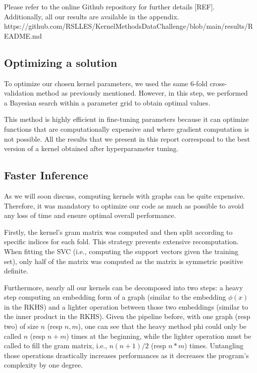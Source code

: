 \documentclass{IEEEtran}
\begin{document}
Please refer to the online Github repository for further details [REF]. Additionally, all our results are available in the appendix.
https://github.com/RSLLES/KernelMethodsDataChallenge/blob/main/results/README.md

\subsection{Optimizing a solution}
To optimize our chosen kernel parameters, we used the same 6-fold cross-validation method as previously mentioned. However, in this step, we performed a Bayesian search within a parameter grid to obtain optimal values.

This method is highly efficient in fine-tuning parameters because it can optimize functions that are computationally expensive and where gradient computation is not possible. All the results that we present in this report correspond to the best version of a kernel obtained after hyperparameter tuning.



\subsection{Faster Inference}
As we will soon discuss, computing kernels with graphs can be quite expensive. Therefore, it was mandatory to optimize our code as much as possible to avoid any loss of time and ensure optimal overall performance.

Firstly, the kernel's gram matrix was computed and then split according to specific indices for each fold. This strategy prevents extensive recomputation. When fitting the SVC (i.e., computing the support vectors given the training set), only half of the matrix was computed as the matrix is symmetric positive definite.

Furthermore, nearly all our kernels can be decomposed into two steps: a heavy step computing an embedding form of a graph (similar to the embedding $\phi(x)$ in the RKHS) and a lighter operation between those two embeddings (similar to the inner product in the RKHS). Given the pipeline before, with one graph (resp two) of size $n$ (resp $n,m$), one can see that the heavy method phi could only be called $n$ (resp $n+m$) times at the beginning, while the lighter operation must be called to fill the gram matrix, i.e., $n(n+1)/2$ (resp $n*m$) times. Untangling those operations drastically increases performances as it decreases the program's complexity by one degree.
\end{document}
